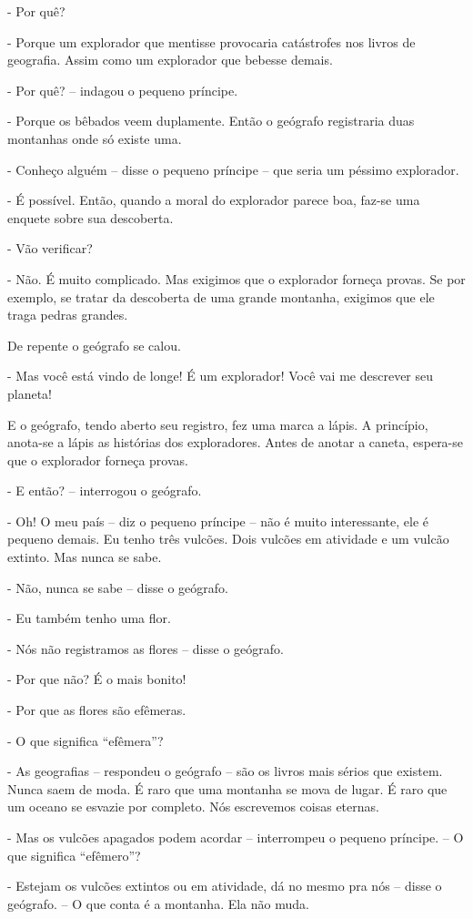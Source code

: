 - Por quê?

- Porque um explorador que mentisse provocaria catástrofes nos livros de
geografia. Assim como um explorador que bebesse demais.

- Por quê? -- indagou o pequeno príncipe.

- Porque os bêbados veem duplamente. Então o geógrafo registraria duas
montanhas onde só existe uma.

- Conheço alguém -- disse o pequeno príncipe -- que seria um péssimo
explorador.

- É possível. Então, quando a moral do explorador parece boa, faz-se uma
enquete sobre sua descoberta.

- Vão verificar?

- Não. É muito complicado. Mas exigimos que o explorador forneça provas.
Se por exemplo, se tratar da descoberta de uma grande montanha, exigimos
que ele traga pedras grandes.

De repente o geógrafo se calou.

- Mas você está vindo de longe! É um explorador! Você vai me descrever
seu planeta!

E o geógrafo, tendo aberto seu registro, fez uma marca a lápis. A
princípio, anota-se a lápis as histórias dos exploradores. Antes de
anotar a caneta, espera-se que o explorador forneça provas.

- E então? -- interrogou o geógrafo.

- Oh! O meu país -- diz o pequeno príncipe -- não é muito interessante,
ele é pequeno demais. Eu tenho três vulcões. Dois vulcões em atividade e
um vulcão extinto. Mas nunca se sabe.

- Não, nunca se sabe -- disse o geógrafo.

- Eu também tenho uma flor.

- Nós não registramos as flores -- disse o geógrafo.

- Por que não? É o mais bonito!

- Por que as flores são efêmeras.

- O que significa ``efêmera''?

- As geografias -- respondeu o geógrafo -- são os livros mais sérios que
existem. Nunca saem de moda. É raro que uma montanha se mova de lugar. É
raro que um oceano se esvazie por completo. Nós escrevemos coisas
eternas.

- Mas os vulcões apagados podem acordar -- interrompeu o pequeno
príncipe. -- O que significa ``efêmero''?

- Estejam os vulcões extintos ou em atividade, dá no mesmo pra nós --
disse o geógrafo. -- O que conta é a montanha. Ela não muda.

